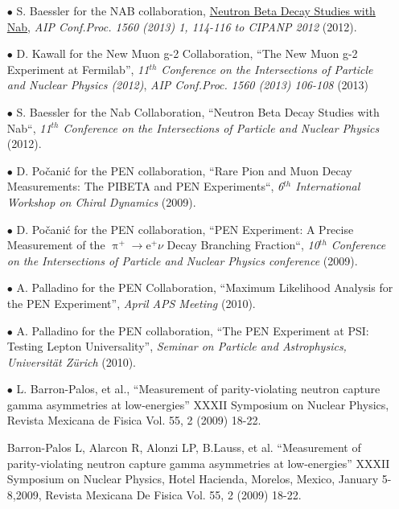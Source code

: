 \documentclass{article}[10pt]
\begin{document}
\begin{itemize}
\item [$\bullet$] S. Baessler for the NAB collaboration, \href{https://inspirehep.net/literature/1187655}{Neutron Beta Decay Studies with Nab}, \emph{AIP Conf.Proc. 1560 (2013) 1, 114-116 to CIPANP 2012} (2012).

\item [$\bullet$] D. Kawall for the New Muon g-2 Collaboration, ``The New Muon g-2 Experiment at Fermilab'', \emph{11$^{th}$ Conference on the Intersections of Particle and Nuclear Physics (2012)}, \emph{AIP Conf.Proc. 1560 (2013) 106-108} (2013)

\item [$\bullet$] S. Baessler for the Nab Collaboration, ``Neutron Beta Decay Studies with Nab``, \emph{11$^{th}$ Conference on the Intersections of Particle and Nuclear Physics } (2012).

\item [$\bullet$] D. Po\v{c}ani\'c for the PEN collaboration, ``Rare Pion and Muon Decay Measurements: The PIBETA and PEN Experiments``, \emph{6$^{th}$ International Workshop on Chiral Dynamics} (2009).

\item [$\bullet$] D. Po\v{c}ani\'c for the PEN collaboration, ``PEN Experiment: A Precise Measurement of the $\uppi^{+}\rightarrow\mathrm{e}^{+}\nu$ Decay Branching Fraction``, \emph{10$^{th}$ Conference on the Intersections of Particle and Nuclear Physics conference} (2009).

\item [$\bullet$] A. Palladino for the PEN Collaboration, ``Maximum Likelihood Analysis for the PEN Experiment'', \emph{April APS Meeting} (2010).

\item [$\bullet$] A. Palladino for the PEN collaboration, ``The PEN Experiment at PSI: Testing Lepton Universality'', \emph{Seminar on Particle and Astrophysics, Universit\"at Z\"urich} (2010).

\item [$\bullet$] L. Barron-Palos, et al., ``Measurement of parity-violating neutron capture gamma asymmetries at low-energies'' XXXII Symposium on Nuclear Physics, Revista Mexicana de Fisica Vol. 55, 2 (2009) 18-22.

Barron-Palos L, Alarcon R, Alonzi LP, B.Lauss, et al. ``Measurement of parity-violating neutron capture gamma asymmetries at low-energies'' XXXII Symposium on Nuclear Physics, Hotel Hacienda, Morelos, Mexico, January 5-8,2009, Revista Mexicana De Fisica Vol. 55, 2 (2009) 18-22.



\end{itemize}
\end{document}
